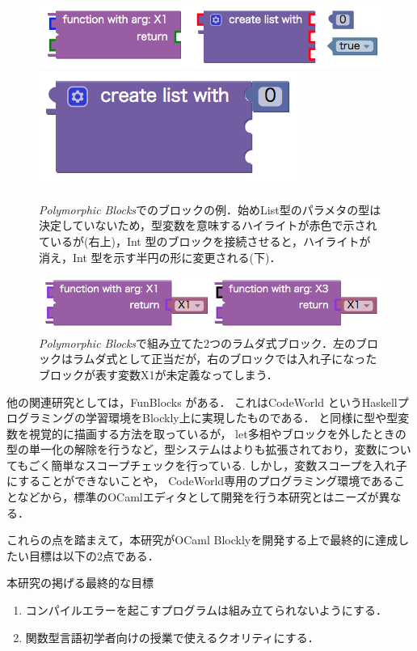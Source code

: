 \begin{figure}[t]
 \centering
 \includegraphics[scale=0.4]{img/blockEx.png}
 \includegraphics[scale=0.4]{img/intList.png} %
 \caption{{\it Polymorphic Blocks}でのブロックの例．始めList型のパラメタの型は決定していないため，型変数を意味するハイライトが赤色で示されているが(右上)，Int 型のブロックを接続させると，ハイライトが消え，Int 型を示す半円の形に変更される(下)．\label{fig:polyBlockList}}
 \vspace{2zh}
 \includegraphics[scale=0.4]{img/unboundValue.png}
 \caption{{\it Polymorphic Blocks}で組み立てた2つのラムダ式ブロック．左のブロックはラムダ式として正当だが，右のブロックでは入れ子になったブロックが表す変数X1が未定義なってしまう．\label{fig:unboundValue}}
\end{figure}

他の関連研究としては，FunBlocks \cite{FunBlocks}がある．
これはCodeWorld \cite{CodeWorld} というHaskellプログラミングの学習環境をBlockly上に実現したものである．
\cite{Typed-Blockly}と同様に型や型変数を視覚的に描画する方法を取っているが，
let多相やブロックを外したときの型の単一化の解除を行うなど，型システムは\cite{Typed-Blockly}よりも拡張されており，変数についてもごく簡単なスコープチェックを行っている.
しかし，変数スコープを入れ子にすることができないことや，
CodeWorld専用のプログラミング環境であることなどから，標準のOCamlエディタとして開発を行う本研究とはニーズが異なる．

これらの点を踏まえて，本研究がOCaml Blocklyを開発する上で最終的に達成したい目標は以下の2点である．

\begin{itembox}[l]{本研究の掲げる最終的な目標}
  \begin {enumerate}
    \item コンパイルエラーを起こすプログラムは組み立てられないようにする．
    \item 関数型言語初学者向けの授業で使えるクオリティにする．
  \end {enumerate}
\end{itembox}

